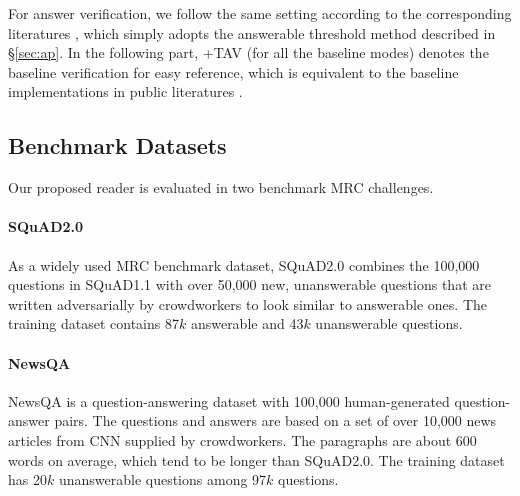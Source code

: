 \documentclass[letterpaper]{article} %
\begin{document}

For answer verification, %
we follow the same setting according to the corresponding literatures \cite{devlin2018bert,Lan2020ALBERT,clark2019electra}, which simply adopts the answerable threshold method described in \S\ref{sec:ap}. In the following part, +TAV (for all the baseline modes) denotes the baseline verification for easy reference, which is equivalent to the baseline implementations in public literatures \cite{devlin2018bert,Lan2020ALBERT,clark2019electra}.

\subsection{Benchmark Datasets}
Our proposed reader is evaluated in two benchmark MRC challenges.
\paragraph{SQuAD2.0}
As a widely used MRC benchmark dataset, 
SQuAD2.0  \cite{Rajpurkar2018Know} combines the 100,000 questions in SQuAD1.1 \cite{Rajpurkar2016SQuAD} with over 50,000 new, unanswerable questions that are written adversarially by crowdworkers to look similar to answerable ones. 
The training dataset contains 87$k$ answerable and 43$k$ unanswerable questions.

\paragraph{NewsQA}
NewsQA 
\cite{trischler2017newsqa} %
is a question-answering dataset with 100,000 human-generated question-answer pairs. The questions and answers are based on a set of over 10,000 news articles from CNN supplied by crowdworkers. The paragraphs are about 600 words on average, which tend to be longer than SQuAD2.0. The training dataset has
20$k$ unanswerable questions among 97$k$ questions.

\end{document}
